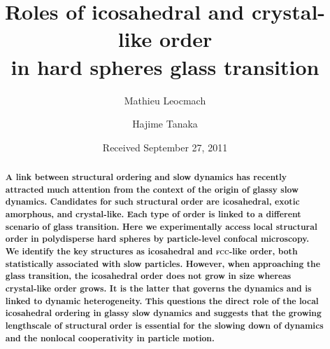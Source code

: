 

\usepackage{xr}



\title{Roles of icosahedral and crystal-like order \\ in hard spheres glass transition} 


\author{Mathieu Leocmach} 

\author{Hajime Tanaka}

\date{Received September 27, 2011}

\begin{abstract}
\textbf{
A link between structural ordering and slow dynamics has recently attracted much attention from the context of the origin of glassy slow dynamics. Candidates for such structural order are icosahedral, exotic amorphous, and crystal-like. Each type of order is linked to a different scenario of glass transition. Here we experimentally access local structural order in polydisperse hard spheres by particle-level confocal microscopy. We identify the key structures as icosahedral and \textmd{\textsc{fcc}}-like order, both statistically associated with slow particles. However, when approaching the glass transition, the icosahedral order does not grow in size whereas crystal-like order grows. It is the latter that governs the dynamics and is linked to dynamic heterogeneity. This questions the direct role of the local icosahedral ordering in glassy slow dynamics and suggests that the growing lengthscale of structural order is essential for the slowing down of dynamics and the nonlocal cooperativity in particle motion. 
}
\end{abstract}
\maketitle


